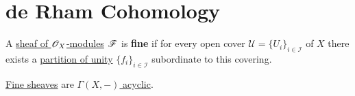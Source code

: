 \documentclass[../../main]{subfiles}
\begin{document}
\chapter{de Rham Cohomology}

\begin{definition} \label{def:fine-sheaf}
  A \hyperref[def:sheaf-of-modules]{sheaf of \(\mathscr{O}_{X}\)-modules} \(\mathscr{F}\) is \textbf{fine} if for every open cover \(\mathscr{U} = \{U_{i}\}_{i \in \mathcal{I}}\) of \(X\) there exists a \hyperref[def:partition-of-unity]{partition of unity} \(\{f_{i}\}_{i \in \mathcal{I}}\) subordinate to this covering.
\end{definition}

\begin{proposition} \label{prop:fine-are-acyclic}
  \hyperref[def:fine-sheaf]{Fine sheaves} are \hyperref[def:acyclic-object]{\(\Gamma(X, -)\) acyclic}.
\end{proposition}
\end{document}
